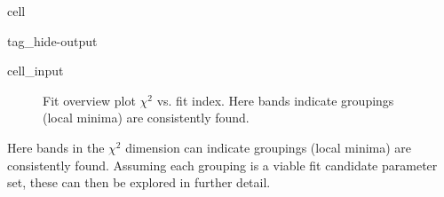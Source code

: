 \documentclass[letterpaper,table,10pt,english]{jupyterBook}
\begin{document}
\begin{sphinxuseclass}{cell}
\begin{sphinxuseclass}{tag_hide-output}\begin{sphinxVerbatimInput}

\begin{sphinxuseclass}{cell_input}
\begin{sphinxVerbatim}[commandchars=\\\{\}]


 

\PYG{p}{[}\PYG{p}{]}\PYG{p}{[}\PYG{p}{]}
\end{sphinxVerbatim}

\end{sphinxuseclass}\end{sphinxVerbatimInput}

\end{sphinxuseclass}
\end{sphinxuseclass}
\begin{figure}[htbp]
\centering
\capstart

\noindent{}
\caption{Fit overview plot \sphinxhyphen{} \(\chi^2\) vs. fit index. Here bands indicate groupings (local minima) are consistently found.}\label{\detokenize{part2/case-study-N2_290723:fig-n2-fithist}}\end{figure}

\sphinxAtStartPar
Here bands in the \(\chi^2\) dimension can indicate groupings (local minima) are consistently found. Assuming each grouping is a viable fit candidate parameter set, these can then be explored in further detail.
\end{document}
